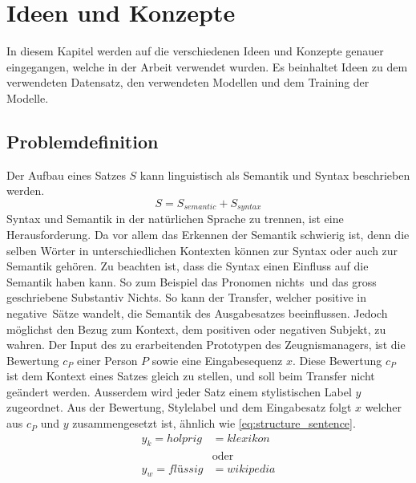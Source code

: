 \chapter{Ideen und Konzepte}
\label{ch:ideen_konzepte}
In diesem Kapitel werden auf die verschiedenen Ideen und Konzepte genauer eingegangen, welche in der Arbeit verwendet
wurden. Es beinhaltet Ideen zu dem verwendeten Datensatz, den verwendeten Modellen und dem Training der Modelle.

\section{Problemdefinition}
\label{sec:Problemdefinition}
Der Aufbau eines Satzes $ S $ kann linguistisch als Semantik und Syntax beschrieben werden.
\noindent
{}
\begin{equation}
	S = S_{semantic} + S_{syntax}
	\label{eq:structure_sentence}
\end{equation}
\noindent
Syntax und Semantik in der natürlichen Sprache zu trennen, ist eine Herausforderung. Da vor allem das Erkennen der
Semantik schwierig ist, denn die selben Wörter in unterschiedlichen Kontexten können zur Syntax oder auch zur Semantik
gehören. Zu beachten ist, dass die Syntax einen Einfluss auf die Semantik haben kann. So zum Beispiel das Pronomen \flqq
nichts\frqq \ und das gross geschriebene Substantiv \flqq Nichts\frqq. So kann der Transfer, welcher \flqq positive\frqq
in \flqq negative\frqq \ Sätze wandelt, die Semantik des Ausgabesatzes beeinflussen. Jedoch möglichst den Bezug zum
Kontext, dem positiven oder negativen Subjekt, zu wahren.
\newline
\newline
Der Input des zu erarbeitenden Prototypen des Zeugnismanagers, ist die Bewertung $ c_{P} $ einer Person $ P $ sowie eine
Eingabesequenz $x$. Diese Bewertung $c_P$ ist dem Kontext eines Satzes gleich zu stellen, und soll beim Transfer nicht
geändert werden. Ausserdem wird jeder Satz einem stylistischen Label $y$ zugeordnet. Aus der Bewertung, Stylelabel und dem
Eingabesatz folgt $ x $ welcher aus $c_P$ und $y$ zusammengesetzt ist, ähnlich wie \ref{eq:structure_sentence}.
\noindent
{}
\begin{equation}
	\begin{split}
		y_k = holprig &= klexikon \\
		&\text{oder} \\
		y_w = flüssig &= wikipedia
	\end{split}
	\label{eq:style_labels}
\end{equation}
